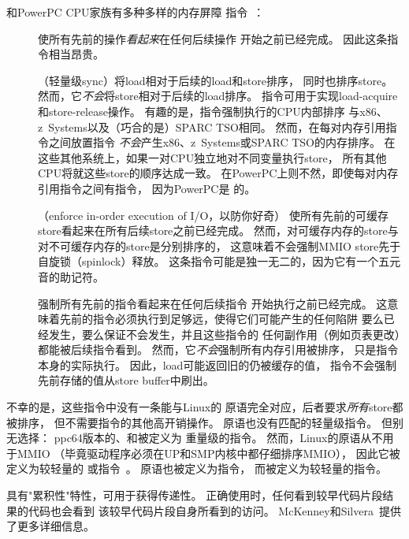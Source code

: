 \Power{}和PowerPC CPU家族有多种多样的内存屏障
指令~\cite{PowerPC94,MichaelLyons05a}：
\begin{description}
\item	[] 使所有先前的操作{\em 看起来}在任何后续操作
	开始之前已经完成。
	因此这条指令相当昂贵。
\item	[]（轻量级sync）将load相对于后续的load和store排序，
	同时也排序store。
	然而，它{\em 不会}将store相对于后续的load排序。
	指令可用于实现load-acquire和store-release操作。
	有趣的是，指令强制执行的CPU内部排序
	与x86、z~Systems以及（巧合的是）SPARC TSO相同\@。
	然而，在每对内存引用指令之间放置指令
	\emph{不会}产生x86、z~Systems或SPARC TSO的内存排序。
	在这些其他系统上，如果一对CPU独立地对不同变量执行store，
	所有其他CPU将就这些store的顺序达成一致。
	在PowerPC上则不然，即使每对内存引用指令之间有指令，
	因为PowerPC是
	的。
\item	[]（enforce in-order execution of I/O，以防你好奇）
	使所有先前的可缓存store看起来在所有后续store之前已经完成。
	然而，对可缓存内存的store与对不可缓存内存的store是分别排序的，
	这意味着不会强制MMIO store先于自旋锁（spinlock）释放。
	这条指令可能是独一无二的，因为它有一个五元音的助记符。
\item	[] 强制所有先前的指令看起来在任何后续指令
	开始执行之前已经完成。
	这意味着先前的指令必须执行到足够远，使得它们可能产生的任何陷阱
	要么已经发生，要么保证不会发生，并且这些指令的
	任何副作用（例如页表更改）都能被后续指令看到。
	然而，它\emph{不会}强制所有内存引用被排序，
	只是指令本身的实际执行。
	因此，load可能返回旧的仍被缓存的值，
	指令不会强制先前存储的值从store buffer中刷出。
\end{description}

不幸的是，这些指令中没有一条能与Linux的
原语完全对应，后者要求\emph{所有}store都被排序，
但不需要指令的其他高开销操作。
原语也没有匹配的轻量级指令。
但别无选择：
{ppc64}版本的、和被定义为
重量级的指令。
然而，Linux的原语从不用于MMIO
（毕竟驱动程序必须在UP和SMP内核中都仔细排序MMIO），
因此它被定义为较轻量的
或指令~\cite{PaulEMcKenney2016LinuxKernelMMIO}。
原语也被定义为指令，
而被定义为较轻量的指令。

\Power{}具有"累积性"特性，可用于获得传递性。
正确使用时，任何看到较早代码片段结果的代码也会看到
该较早代码片段自身所看到的访问。
McKenney和Silvera~\cite{PaulEMcKenneyN2745r2009}提供了更多详细信息。

